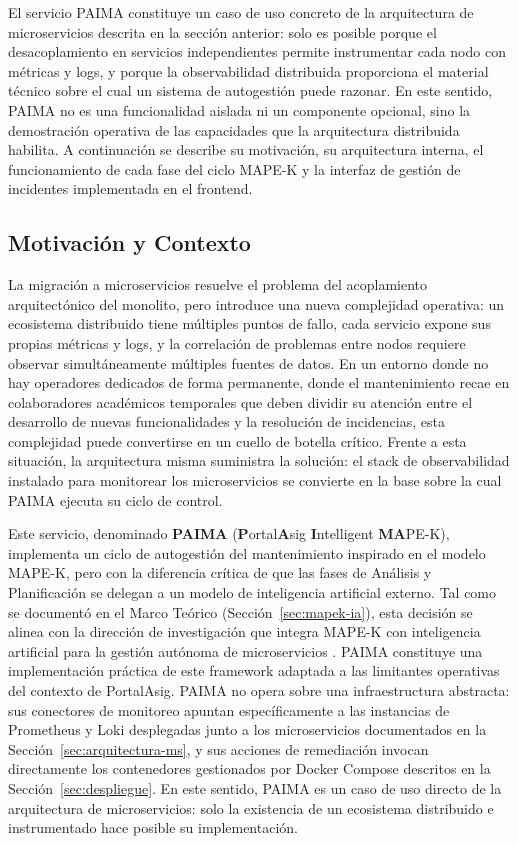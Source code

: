 El servicio PAIMA constituye un caso de uso concreto de la arquitectura de
microservicios descrita en la sección anterior: solo es posible porque el
desacoplamiento en servicios independientes permite instrumentar cada nodo con
métricas y logs, y porque la observabilidad distribuida proporciona el material
técnico sobre el cual un sistema de autogestión puede razonar. En este sentido,
PAIMA no es una funcionalidad aislada ni un componente opcional, sino la
demostración operativa de las capacidades que la arquitectura distribuida habilita.
A continuación se describe su motivación, su arquitectura interna, el funcionamiento
de cada fase del ciclo MAPE-K y la interfaz de gestión de incidentes implementada
en el frontend.

\subsection{Motivación y Contexto}

La migración a microservicios resuelve el problema del acoplamiento arquitectónico del
monolito, pero introduce una nueva complejidad operativa: un ecosistema distribuido
tiene múltiples puntos de fallo, cada servicio expone sus propias métricas y logs, y
la correlación de problemas entre nodos requiere observar simultáneamente múltiples
fuentes de datos. En un entorno donde no hay operadores dedicados de forma permanente, donde el mantenimiento recae en colaboradores académicos temporales que
deben dividir su atención entre el desarrollo de nuevas funcionalidades y la
resolución de incidencias, esta complejidad puede convertirse en un cuello de botella
crítico. Frente a esta situación, la arquitectura misma suministra la solución: el
stack de observabilidad instalado para monitorear los microservicios se convierte en
la base sobre la cual PAIMA ejecuta su ciclo de control.

Este servicio, denominado \textbf{PAIMA} (\textbf{P}ortal\textbf{A}sig \textbf{I}ntelligent \textbf{MA}PE-K), implementa un ciclo de autogestión del mantenimiento inspirado en el
modelo MAPE-K, pero con la diferencia crítica de que las fases de Análisis y
Planificación se delegan a un modelo de inteligencia artificial externo. Tal como se
documentó en el Marco Teórico (Sección~\ref{sec:mapek-ia}), esta decisión se alinea con la
dirección de investigación que integra MAPE-K con inteligencia artificial para la
gestión autónoma de microservicios \cite{esposito2025mapek}. PAIMA constituye una implementación práctica de este
framework adaptada a las limitantes operativas del contexto de PortalAsig. PAIMA no opera sobre una infraestructura
abstracta: sus conectores de monitoreo apuntan específicamente a las instancias de
Prometheus y Loki desplegadas junto a los microservicios documentados en la Secci\'{o}n~\ref{sec:arquitectura-ms}, y sus acciones de remediación invocan directamente los contenedores
gestionados por Docker Compose descritos en la Sección~\ref{sec:despliegue}. En este sentido,
PAIMA es un caso de uso directo de la arquitectura de microservicios: solo la
existencia de un ecosistema distribuido e instrumentado hace posible su implementación.


